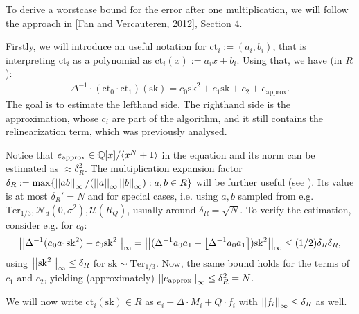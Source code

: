 \documentclass[letterpaper,10pt,english]{jupyterBook}
\begin{document}
\sphinxAtStartPar
To derive a worst\sphinxhyphen{}case bound for the error after one multiplication, we will follow the approach in {[}\hyperlink{cite.Thesis:id70}{Fan and Vercauteren, 2012}{]}, Section 4.

\sphinxAtStartPar
Firstly, we will introduce an useful notation for \(\mathrm{ct}_i := (a_i,b_i)\), that is interpreting \(\mathrm{ct}_i\) as a polynomial as \(\mathrm{ct}_i(x) := a_i x + b_i\).
Using that, we have (in \(R\)):
\begin{equation}\label{equation:Thesis:multiplication-approximation}
\begin{split}\Delta^{-1}\cdot (\mathrm{ct}_0 \cdot \mathrm{ct}_1)(\mathrm{sk}) = c_0\mathrm{sk}^2 + c_1\mathrm{sk} + c_2 + e_{\text{approx}}.\end{split}
\end{equation}
\sphinxAtStartPar
The goal is to estimate the left\sphinxhyphen{}hand side.
The right\sphinxhyphen{}hand side is the approximation, whose \(c_i\) are part of the algorithm, and it still contains the relinearization term, which was previously analysed.

\sphinxAtStartPar
Notice that \(e_{\text{approx}} \in \mathbb Q[x]/\langle x^N+1\rangle\) in the equation and its norm can be estimated as \(\approx \delta_R^2\).
The multiplication expansion factor \(\delta_R := \max \{\left\lvert\left\lvert ab \right\rvert\right\rvert_\infty/(\left\lvert\left\lvert a \right\rvert\right\rvert_\infty\left\lvert\left\lvert b \right\rvert\right\rvert_\infty): a,b \in R\}\) will be further useful (see {\hyperref[\detokenize{Thesis:conclusion-on-delta-r}]{}}).
Its value is at most \(\delta_R' = N\) and for special cases, i.e. using \(a, b\) sampled from e.g. \(\mathrm{Ter}_{1/3}, \mathcal N_d(0,\sigma^2), \mathcal U (R_Q)\), usually around \(\delta_R = \sqrt{N}\).
To verify the estimation, consider e.g. for \(c_0\):
\begin{equation*}
\begin{split}\left\lvert\left\lvert \Delta^{-1}(a_0a_1\mathrm{sk}^2) - c_0\mathrm{sk}^2 \right\rvert\right\rvert_\infty = \left\lvert\left\lvert (\Delta^{-1}a_0a_1 - \left\lfloor \Delta^{-1}a_0a_1 \right\rceil)\mathrm{sk}^2 \right\rvert\right\rvert_\infty\le (1/2) \delta_R \delta_R,\end{split}
\end{equation*}
\sphinxAtStartPar
using \(\left\lvert\left\lvert \mathrm{sk}^2 \right\rvert\right\rvert_\infty \le \delta_R\) for \(\mathrm{sk} \sim \mathrm{Ter}_{1/3}\).
Now, the same bound holds for the terms of \(c_1\) and \(c_2\), yielding (approximately) \(\left\lvert\left\lvert e_{\text{approx}} \right\rvert\right\rvert_\infty \le \delta_R^2 = N\).

\sphinxAtStartPar
We will now write \(\mathrm{ct}_i(\mathrm{sk}) \in R\) as \(e_i + \Delta \cdot M_i + Q \cdot f_i\) with \(\left\lvert\left\lvert f_i \right\rvert\right\rvert_\infty \le \delta_R\) as well.
\end{document}
